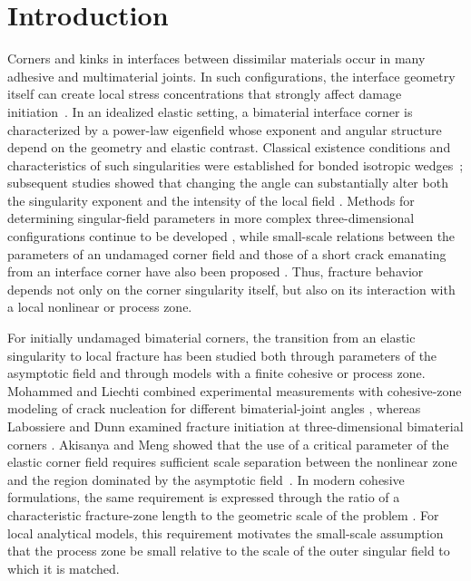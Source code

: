\documentclass[pdflatex,onecolumn,sn-mathphys-ay]{sn-jnl}
\begin{document}
\section{Introduction}
\label{sec:introduction}

Corners and kinks in interfaces between dissimilar materials occur in many
adhesive and multimaterial joints. In such configurations, the interface
geometry itself can create local stress concentrations that strongly affect
damage initiation~\citep{GacoinEtAl2009}. In an idealized elastic setting, a
bimaterial interface corner is characterized by a power-law eigenfield whose
exponent and angular structure depend on the geometry and elastic contrast.
Classical existence conditions and characteristics of such singularities were
established for bonded isotropic wedges~\citep{BogyWang1971,DempseySinclair1981};
subsequent studies showed that changing the angle can substantially alter both
the singularity exponent and the intensity of the local field
\citep{MohammedLiechti2001}. Methods for determining singular-field parameters
in more complex three-dimensional configurations continue to be developed
\citep{MiyazakiFukudaNoda2025}, while small-scale relations between the
parameters of an undamaged corner field and those of a short crack emanating
from an interface corner have also been proposed
\citep{LyuZhangMai2026}. Thus, fracture behavior depends not only on the corner singularity itself,
but also on its interaction with a local nonlinear or process zone.

For initially undamaged bimaterial corners, the transition from an elastic
singularity to local fracture has been studied both through parameters of the
asymptotic field and through models with a finite cohesive or process zone.
Mohammed and Liechti combined experimental measurements with cohesive-zone
modeling of crack nucleation for different bimaterial-joint angles
\citeyearpar{MohammedLiechti2000}, whereas Labossiere and Dunn examined fracture
initiation at three-dimensional bimaterial corners
\citeyearpar{LabossiereDunn2001}. Akisanya and Meng showed that the use of a
critical parameter of the elastic corner field requires sufficient scale
separation between the nonlinear zone and the region dominated by the
asymptotic field~\citeyearpar{AkisanyaMeng2003}. In modern cohesive formulations,
the same requirement is expressed through the ratio of a characteristic
fracture-zone length to the geometric scale of the problem
\citep{GormanThouless2022,ThoulessGoutianos2023}. For local analytical models, this requirement motivates the small-scale
assumption that the process zone be small relative to the scale of the outer
singular field to which it is matched.
\end{document}
